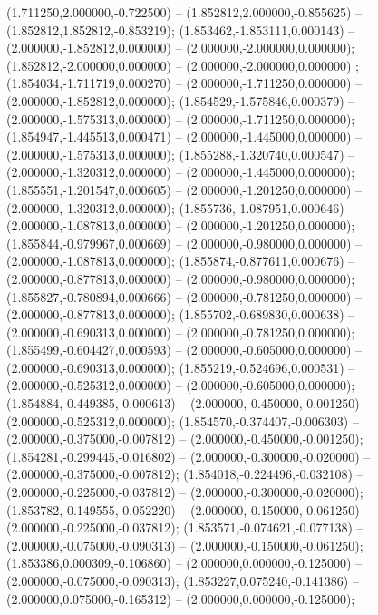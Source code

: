  (1.711250,2.000000,-0.722500) -- (1.852812,2.000000,-0.855625) -- (1.852812,1.852812,-0.853219);
 (1.853462,-1.853111,0.000143) -- (2.000000,-1.852812,0.000000) -- (2.000000,-2.000000,0.000000);
 (1.852812,-2.000000,0.000000) -- (2.000000,-2.000000,0.000000) ;
 (1.854034,-1.711719,0.000270) -- (2.000000,-1.711250,0.000000) -- (2.000000,-1.852812,0.000000);
 (1.854529,-1.575846,0.000379) -- (2.000000,-1.575313,0.000000) -- (2.000000,-1.711250,0.000000);
 (1.854947,-1.445513,0.000471) -- (2.000000,-1.445000,0.000000) -- (2.000000,-1.575313,0.000000);
 (1.855288,-1.320740,0.000547) -- (2.000000,-1.320312,0.000000) -- (2.000000,-1.445000,0.000000);
 (1.855551,-1.201547,0.000605) -- (2.000000,-1.201250,0.000000) -- (2.000000,-1.320312,0.000000);
 (1.855736,-1.087951,0.000646) -- (2.000000,-1.087813,0.000000) -- (2.000000,-1.201250,0.000000);
 (1.855844,-0.979967,0.000669) -- (2.000000,-0.980000,0.000000) -- (2.000000,-1.087813,0.000000);
 (1.855874,-0.877611,0.000676) -- (2.000000,-0.877813,0.000000) -- (2.000000,-0.980000,0.000000);
 (1.855827,-0.780894,0.000666) -- (2.000000,-0.781250,0.000000) -- (2.000000,-0.877813,0.000000);
 (1.855702,-0.689830,0.000638) -- (2.000000,-0.690313,0.000000) -- (2.000000,-0.781250,0.000000);
 (1.855499,-0.604427,0.000593) -- (2.000000,-0.605000,0.000000) -- (2.000000,-0.690313,0.000000);
 (1.855219,-0.524696,0.000531) -- (2.000000,-0.525312,0.000000) -- (2.000000,-0.605000,0.000000);
 (1.854884,-0.449385,-0.000613) -- (2.000000,-0.450000,-0.001250) -- (2.000000,-0.525312,0.000000);
 (1.854570,-0.374407,-0.006303) -- (2.000000,-0.375000,-0.007812) -- (2.000000,-0.450000,-0.001250);
 (1.854281,-0.299445,-0.016802) -- (2.000000,-0.300000,-0.020000) -- (2.000000,-0.375000,-0.007812);
 (1.854018,-0.224496,-0.032108) -- (2.000000,-0.225000,-0.037812) -- (2.000000,-0.300000,-0.020000);
 (1.853782,-0.149555,-0.052220) -- (2.000000,-0.150000,-0.061250) -- (2.000000,-0.225000,-0.037812);
 (1.853571,-0.074621,-0.077138) -- (2.000000,-0.075000,-0.090313) -- (2.000000,-0.150000,-0.061250);
 (1.853386,0.000309,-0.106860) -- (2.000000,0.000000,-0.125000) -- (2.000000,-0.075000,-0.090313);
 (1.853227,0.075240,-0.141386) -- (2.000000,0.075000,-0.165312) -- (2.000000,0.000000,-0.125000);
